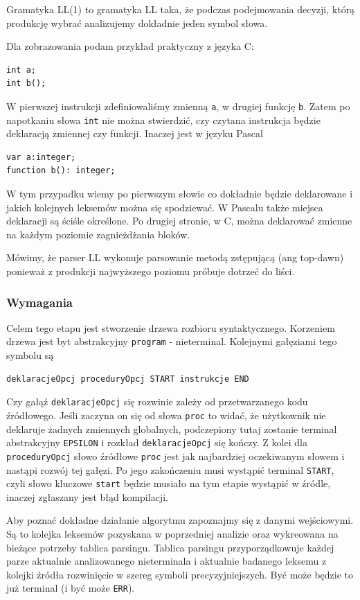 \documentclass[a4paper,12pt]{article}
\begin{document}
Gramatyka LL(1) to gramatyka LL taka, że podczas podejmowania decyzji, którą produkcję wybrać
analizujemy dokładnie jeden symbol słowa.

Dla zobrazowania podam przykład praktyczny z języka C: %
\begin{verbatim}
int a;
int b();
\end{verbatim}
W pierwszej instrukcji zdefiniowaliśmy zmienną \verb|a|, w drugiej funkcję \verb|b|. 
Zatem po napotkaniu słowa \verb|int| nie można stwierdzić, czy czytana instrukcja będzie deklaracją zmiennej czy funkcji.
Inaczej jest w języku Pascal
\begin{verbatim}
var a:integer;
function b(): integer;
\end{verbatim}
W tym przypadku wiemy po pierwszym słowie co dokładnie będzie deklarowane i jakich kolejnych leksemów można się spodziewać. W Pascalu także miejsca deklaracji są ściśle określone. Po drugiej stronie, w C, można deklarować zmienne na każdym poziomie zagnieżdżania bloków.

Mówimy, że parser LL wykonuje parsowanie metodą zstępującą (ang top-dawn) ponieważ z produkcji najwyższego poziomu próbuje dotrzeć do liści.
\subsubsection{Wymagania}
Celem tego etapu jest stworzenie drzewa rozbioru syntaktycznego. Korzeniem drzewa jest byt abstrakcyjny \verb|program| - nieterminal. Kolejnymi gałęziami tego symbolu są
\begin{verbatim}
deklaracjeOpcj proceduryOpcj START instrukcje END
\end{verbatim}
Czy gałąź \verb|deklaracjeOpcj| się rozwinie zależy od przetwarzanego kodu źródłowego. Jeśli zaczyna on się od słowa \verb|proc| to widać, że użytkownik nie deklaruje żadnych zmiennych globalnych, podczepiony tutaj zostanie terminal abstrakcyjny \verb|EPSILON| i rozkład \verb|deklaracjeOpcj| się kończy. Z kolei dla \verb|proceduryOpcj| słowo źródłowe \verb|proc| jest jak najbardziej oczekiwanym słowem i nastąpi rozwój tej gałęzi. Po jego zakończeniu musi wystąpić terminal \verb|START|, czyli słowo kluczowe \verb|start| będzie musiało na tym etapie wystąpić w źródle, inaczej zgłaszany jest błąd kompilacji.

Aby poznać dokładne działanie algorytmu zapoznajmy się z danymi wejściowymi. Są to kolejka leksemów pozyskana w poprzedniej analizie oraz wykreowana na bieżące potrzeby tablica parsingu. Tablica parsingu przyporządkowuje każdej parze aktualnie analizowanego nieterminala i aktualnie badanego leksemu z kolejki źródła rozwinięcie w szereg symboli precyzyjniejszych. Być może będzie to już terminal (i być może \verb|ERR|).
\end{document}
